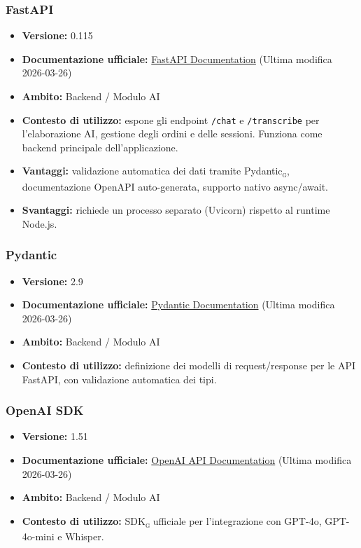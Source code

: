 \documentclass[a4paper, 11pt, oneside]{scrartcl}
\begin{document}
\subsubsection{FastAPI}
\begin{itemize}[noitemsep]
\item \textbf{Versione:} 0.115
\item \textbf{Documentazione ufficiale:} \href{https://fastapi.tiangolo.com/}{FastAPI Documentation} (Ultima modifica 2026-03-26)
\item \textbf{Ambito:} Backend / Modulo AI
\item \textbf{Contesto di utilizzo:} espone gli endpoint \texttt{/chat} e \texttt{/transcribe} per l'elaborazione AI, gestione degli ordini e delle sessioni. Funziona come backend principale dell’applicazione.
\item \textbf{Vantaggi:} validazione automatica dei dati tramite Pydantic\textsubscript{\textsc{g}}, documentazione OpenAPI auto-generata, supporto nativo async/await.
\item \textbf{Svantaggi:} richiede un processo separato (Uvicorn) rispetto al runtime Node.js.
\end{itemize}

\subsubsection{Pydantic}
\begin{itemize}[noitemsep]
\item \textbf{Versione:} 2.9
\item \textbf{Documentazione ufficiale:} \href{https://docs.pydantic.dev/latest/}{Pydantic Documentation} (Ultima modifica 2026-03-26)
\item \textbf{Ambito:} Backend / Modulo AI
\item \textbf{Contesto di utilizzo:} definizione dei modelli di request/response per le API FastAPI, con validazione automatica dei tipi.
\end{itemize}

\subsubsection{OpenAI SDK}
\begin{itemize}[noitemsep]
\item \textbf{Versione:} 1.51
\item \textbf{Documentazione ufficiale:} \href{https://platform.openai.com/docs}{OpenAI API Documentation} (Ultima modifica 2026-03-26)
\item \textbf{Ambito:} Backend / Modulo AI
\item \textbf{Contesto di utilizzo:} SDK\textsubscript{\textsc{g}} ufficiale per l'integrazione con GPT-4o, GPT-4o-mini e Whisper.
\end{itemize}
\end{document}
